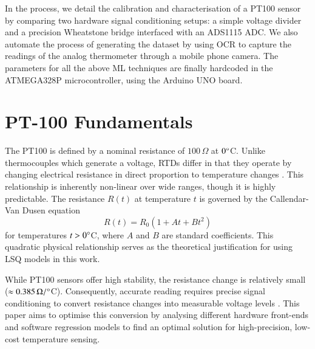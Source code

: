 \documentclass[conference]{IEEEtran}
\begin{document}
In the process, we detail the calibration and characterisation of a PT100 sensor by comparing two hardware signal conditioning setups: a simple voltage divider and a precision Wheatstone bridge interfaced with an ADS1115 ADC. We also automate the process of generating the dataset by using OCR to capture the readings of the analog thermometer through a mobile phone camera. The parameters for all the above ML techniques are finally hardcoded in the ATMEGA328P microcontroller, using the Arduino UNO board.

\section{PT-100 Fundamentals}
The PT100 is defined by a nominal resistance of $100\,\Omega$ at $0\degree$C. Unlike thermocouples which generate a voltage, RTDs differ in that they operate by changing electrical resistance in direct proportion to temperature changes \cite{sensor_physics}. This relationship is inherently non-linear over wide ranges, though it is highly predictable. The resistance $R(t)$ at temperature $t$ is governed by the Callendar-Van Dusen equation \cite{callendar_vd}
\begin{equation}
    R(t) = R_0 (1 + A t + B t^2)
\end{equation}
for temperatures $t > 0\degree$C, where $A$ and $B$ are standard coefficients. This quadratic physical relationship serves as the theoretical justification for using LSQ models in this work.

While PT100 sensors offer high stability, the resistance change is relatively small ($\approx 0.385\,\Omega/\degree$C). Consequently, accurate reading requires precise signal conditioning to convert resistance changes into measurable voltage levels \cite{wheatstone_ref}. This paper aims to optimise this conversion by analysing different hardware front-ends and software regression models to find an optimal solution for high-precision, low-cost temperature sensing.
\end{document}
